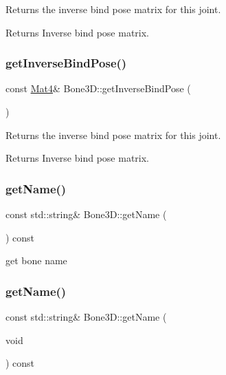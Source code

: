 Returns the inverse bind pose matrix for this joint.

\begin{DoxyReturn}{Returns}
Inverse bind pose matrix. 
\end{DoxyReturn}
\mbox{\label{classBone3D_abeee6535e308b6057b1329b04f2a5b63}} 
\subsubsection{\texorpdfstring{get\+Inverse\+Bind\+Pose()}{getInverseBindPose()}\hspace{0.1cm}{\footnotesize\ttfamily [2/2]}}
{\footnotesize\ttfamily const \hyperlink{classMat4}{Mat4}\& Bone3\+D\+::get\+Inverse\+Bind\+Pose (\begin{DoxyParamCaption}{ }\end{DoxyParamCaption})}

Returns the inverse bind pose matrix for this joint.

\begin{DoxyReturn}{Returns}
Inverse bind pose matrix. 
\end{DoxyReturn}
\mbox{\label{classBone3D_a013182c8e209ddf9282c7cb6e42d3d25}} 
\subsubsection{\texorpdfstring{get\+Name()}{getName()}\hspace{0.1cm}{\footnotesize\ttfamily [1/2]}}
{\footnotesize\ttfamily const std\+::string\& Bone3\+D\+::get\+Name (\begin{DoxyParamCaption}{ }\end{DoxyParamCaption}) const\hspace{0.3cm}{\ttfamily [inline]}}

get bone name \mbox{\label{classBone3D_a013182c8e209ddf9282c7cb6e42d3d25}} 
\subsubsection{\texorpdfstring{get\+Name()}{getName()}\hspace{0.1cm}{\footnotesize\ttfamily [2/2]}}
{\footnotesize\ttfamily const std\+::string\& Bone3\+D\+::get\+Name (\begin{DoxyParamCaption}\item[{void}]{ }\end{DoxyParamCaption}) const\hspace{0.3cm}{\ttfamily [inline]}}


